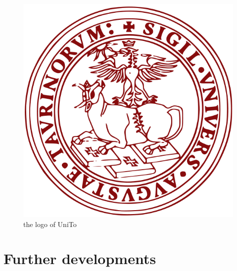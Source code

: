 \begin{figure}
\centering

\includegraphics[scale=0.15]{head/logo.png}
\caption{the logo of UniTo}

\end{figure}


\section[Further developments]{Further developments}

